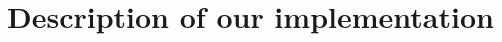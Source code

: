 \documentclass[a4paper, 11pt]{article}
\begin{document}
\restoregeometry
\tableofcontents
\newpage



\newpage

\section{Description of our implementation}
















\newpage

 

\end{document}
